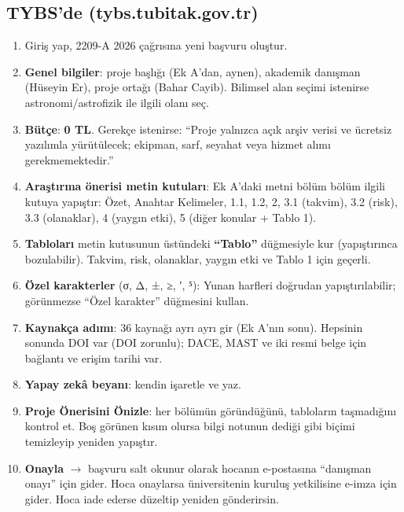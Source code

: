 \documentclass[11pt,a4paper]{article}
\begin{document}
\subsection{TYBS'de (tybs.tubitak.gov.tr)}
\begin{enumerate}
\item Giriş yap, 2209-A 2026 çağrısına yeni başvuru oluştur.
\item \textbf{Genel bilgiler}: proje başlığı (Ek A'dan, aynen), akademik danışman (Hüseyin Er), proje ortağı (Bahar Cayib). Bilimsel alan seçimi istenirse astronomi/astrofizik ile ilgili olanı seç.
\item \textbf{Bütçe}: \textbf{0 TL}. Gerekçe istenirse: ``Proje yalnızca açık arşiv verisi ve ücretsiz yazılımla yürütülecek; ekipman, sarf, seyahat veya hizmet alımı gerekmemektedir.''
\item \textbf{Araştırma önerisi metin kutuları}: Ek A'daki metni bölüm bölüm ilgili kutuya yapıştır: Özet, Anahtar Kelimeler, 1.1, 1.2, 2, 3.1 (takvim), 3.2 (risk), 3.3 (olanaklar), 4 (yaygın etki), 5 (diğer konular + Tablo 1).
\item \textbf{Tabloları} metin kutusunun üstündeki \textbf{``Tablo''} düğmesiyle kur (yapıştırınca bozulabilir). Takvim, risk, olanaklar, yaygın etki ve Tablo 1 için geçerli.
\item \textbf{Özel karakterler} (σ, Δ, ±, ≥, ′, ⁵): Yunan harfleri doğrudan yapıştırılabilir; görünmezse ``Özel karakter'' düğmesini kullan.
\item \textbf{Kaynakça adımı}: 36 kaynağı ayrı ayrı gir (Ek A'nın sonu). Hepsinin sonunda DOI var (DOI zorunlu); DACE, MAST ve iki resmi belge için bağlantı ve erişim tarihi var.
\item \textbf{Yapay zekâ beyanı}: kendin işaretle ve yaz.
\item \textbf{Proje Önerisini Önizle}: her bölümün göründüğünü, tabloların taşmadığını kontrol et. Boş görünen kısım olursa bilgi notunun dediği gibi biçimi temizleyip yeniden yapıştır.
\item \textbf{Onayla} $\rightarrow$ başvuru salt okunur olarak hocanın e-postasına ``danışman onayı'' için gider. Hoca onaylarsa üniversitenin kuruluş yetkilisine e-imza için gider. Hoca iade ederse düzeltip yeniden gönderirsin.
\end{enumerate}
\end{document}
